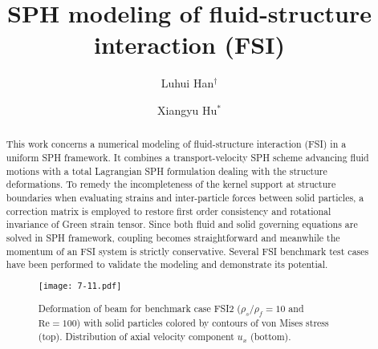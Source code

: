 \documentclass[10pt]{article}
\title{SPH modeling of fluid-structure interaction (FSI)}
\date{}
\author[$\relax$]{Luhui Han$^\dagger$}
\author[$\relax$]{Xiangyu Hu$^*$}
\affil[$\relax$]{Department of Mechanical Engineering, Technical University of Munich, 85747 Garching, Germany}
\affil[$\relax$]{\email{\dagger}{Luhui.han@tum.de}, \email{*}{Xiangyu.hu}}
\begin{document}
\maketitle


\begin{abstract}
This work concerns a numerical modeling of fluid-structure interaction (FSI) in a uniform SPH framework. It combines a transport-velocity SPH scheme \cite{adami2013transport} advancing fluid motions with a total Lagrangian SPH formulation \cite{vignjevic2006sph} dealing with the structure deformations. To remedy the incompleteness of the kernel support at structure boundaries when evaluating strains and inter-particle forces between solid particles, a correction matrix \cite{bonet2002simplified} is employed to restore first order consistency and rotational invariance of Green strain tensor. Since both fluid and solid governing equations are solved in SPH framework, coupling becomes straightforward and meanwhile the momentum of an FSI system is strictly conservative. Several FSI benchmark test cases \cite{bungartz2006fluid} have been performed to validate the modeling and demonstrate its potential.
\begin{figure}[!htb]
\centering
\texttt{[image: 7-11.pdf]}
\caption{Deformation of beam for benchmark case FSI2 \cite{bungartz2006fluid} ($\rho_s/\rho_f = 10$ and $\mathrm{Re} = 100$) with solid
particles colored by contours of von Mises stress (top). Distribution of axial velocity component
$u_x$ (bottom).}\label{fig:7}
\end{figure}

\end{abstract}



\addbib
\end{document}
